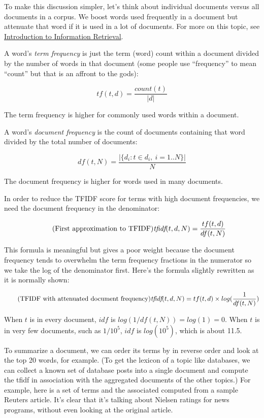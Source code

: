 \documentclass[10pt]{article}
\begin{document}
To make this discussion simpler, let's think about individual documents versus all documents in a corpus. We boost words used frequently in a document but attenuate  that word if it is used in a lot of documents.  For more on this topic, see \href{http://nlp.stanford.edu/IR-book/html/htmledition/term-frequency-and-weighting-1.html}{Introduction to Information Retrieval}.

A word's {\em term frequency} is just the term (word) count within a document divided by the number of words in that document (some people use ``frequency'' to mean ``count'' but that is an affront to the gods):

\[\tag{Term frequency of term $t \in d$, document $d$}
tf(t,d) = \frac{count(t)}{|d|}
\]

\noindent The term frequency is higher for commonly used words within a document.

A word's {\em document frequency} is the count of documents containing that word divided by the total number of documents:

\[\tag{Document frequency of $t$ in $N$ documents}
df(t,N) = \frac{|\{d_i : t \in d_i, \ i = 1..N\}|}{N}
\]

\noindent The document frequency is higher for words used in many documents.

In order to reduce the TFIDF score for terms with high document frequencies, we need the document frequency  in the denominator:

\[\tag{First approximation to TFIDF}
\text{\em tfidf}(t,d,N) = \frac{tf(t,d)}{df(t,N)}
\]

This formula is  meaningful but gives a poor weight because the document frequency tends to overwhelm the term frequency fractions in the numerator so we take the log of the denominator first. Here's the formula slightly rewritten as it is normally shown:

\[\tag{TFIDF with attenuated document frequency}
\text{\em tfidf}(t,d,N) = tf(t,d) \times log(\frac{1}{df(t,N)})
\]

\noindent When $t$ is in every document, $idf$ is $log(1/df(t,N)) = log(1) = 0$. When $t$ is in very few documents, such as $1/10^5$, $idf$ is $log(10^5)$, which is about 11.5.

To summarize a document, we can order its terms by  in reverse order and look at the top 20 words, for example.  (To get the lexicon of a topic like databases, we can collect a known set of database posts into a single document and compute the tfidf in association with the aggregated documents of the other topics.) For example, here is a set of terms and the associated  computed from a sample Reuters article. It's clear that it's talking about Nielsen ratings for news programs, without even looking at the original article.
\end{document}
